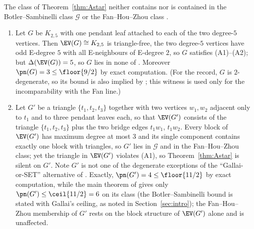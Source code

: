 \begin{proposition}\label{prop:incomp}
The class of Theorem~\ref{thm:Astar} neither contains nor is contained in the Botler--Sambinelli
class $\mathcal{G}$ \cite{BS21} or the Fan--Hou--Zhou class \cite{FHZ23}.
\begin{enumerate}[label={\rm(\roman*)},leftmargin=2em]
\item Let $G$ be $K_{2,5}$ with one pendant leaf attached to each of the two degree-$5$
vertices. Then $\EV(G)\cong K_{2,5}$ is triangle-free, the two degree-$5$ vertices have odd
E-degree $5$ with all E-neighbours of E-degree $2$, so $G$ satisfies (A1)--(A2); but
$\Delta(\EV(G))=5$, so $G$ lies in none of \cite{Fan05,BS21,FHZ23}. Moreover
$\pn(G)=3\le\floor{9/2}$ by exact computation. (For the record, $G$ is $2$-degenerate, so its
bound is also implied by \cite{ZLH24}; this witness is used only for the incomparability with
the Fan line.)
\item Let $G'$ be a triangle $\{t_1,t_2,t_3\}$ together with two vertices $w_1,w_2$ adjacent
only to $t_1$ and to three pendant leaves each, so that $\EV(G')$ consists of the triangle
$\{t_1,t_2,t_3\}$ plus the two bridge edges $t_1w_1$, $t_1w_2$. Every block of $\EV(G')$ has
maximum degree at most $3$ and its single component contains exactly one block with triangles,
so $G'$ lies in $\mathcal{G}$ and in the Fan--Hou--Zhou class; yet the triangle in $\EV(G')$
violates (A1), so Theorem~\ref{thm:Astar} is silent on $G'$. Note $G'$ is not one of the
degenerate exceptions of the ``Gallai-or-SET'' alternative of \cite{BS21}. Exactly,
$\pn(G')=4\le\floor{11/2}$ by exact computation, while the main theorem of \cite{BS21}
gives only $\pn(G')\le\ceil{11/2}=6$ on its class (the Botler--Sambinelli bound is stated
with Gallai's ceiling, as noted in Section~\ref{sec:intro}); the Fan--Hou--Zhou membership
of $G'$ rests on the block structure of $\EV(G')$ alone and is unaffected.
\end{enumerate}
\end{proposition}

